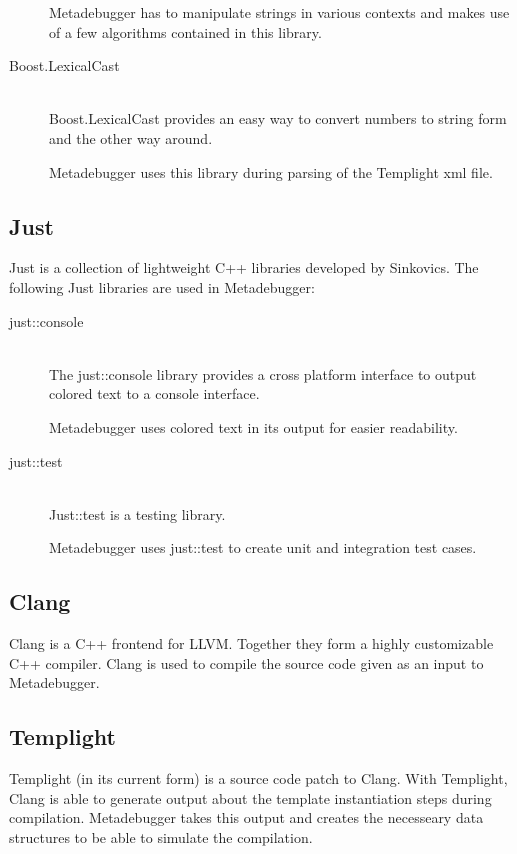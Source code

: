 \begin{description}
        Metadebugger has to manipulate strings in various contexts and makes
        use of a few algorithms contained in this library.
    \item[Boost.LexicalCast] \hfill \\
        Boost.LexicalCast provides an easy way to convert numbers to string
        form and the other way around.

        Metadebugger uses this library during parsing of the Templight xml
        file.

\end{description}

\subsection{Just\cite{just}}

Just is a collection of lightweight C++ libraries developed by Sinkovics. The
following Just libraries are used in Metadebugger:
\begin{description}
    \item[just::console] \hfill \\
        The just::console library provides a cross platform interface to output
        colored text to a console interface.

        Metadebugger uses colored text in its output for easier readability.
    \item[just::test] \hfill \\
        Just::test is a testing library.

        Metadebugger uses just::test to create unit and integration test cases.
\end{description}

\subsection{Clang\cite{clang}}

Clang is a C++ frontend for LLVM. Together they form a highly customizable C++
compiler. Clang is used to compile the source code given as an input to
Metadebugger.

\subsection{Templight\cite{templight}}

Templight (in its current form) is a source code patch to Clang. With
Templight, Clang is able to generate output about the template instantiation
steps during compilation. Metadebugger takes this output and creates the
necesseary data structures to be able to simulate the compilation.


